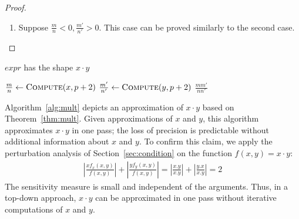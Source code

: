 \documentclass{article}
\newcommand{\expr}{\textit{expr}}
\numberwithin{mytheorem}{section}
\begin{document}
\begin{proof}
\begin{enumerate}
\begin{align*}
\end{align*}
To show that this is valid, it suffices to prove that:
\begin{align*}
\frac{mm'}{nn'}(1-\frac{1}{2^{p}})^2 \leq \frac{mm'}{nn'}(1-\frac{1}{2^{p-2}}) \\
\frac{mm'}{nn'}(1+\frac{1}{2^{p-2}})\leq \frac{mm'}{nn'}(1+\frac{1}{2^{p}})^2
\end{align*}
But $\frac{mm'}{nn'}<0$ and from Proposition~\ref{prop:prec2} (see \ref{app:prop_lem}) we know that both inequalities hold. 
\item
Suppose $\frac{m}{n}<0, \frac{m'}{n'}>0$. This case can be proved similarly to the second case.
\end{enumerate}
\end{proof}

\begin{algorithm}
\caption{Multiplication}\label{alg:mult}
\begin{algorithmic}[1]
\Require $\expr$ has the shape $x\cdot y$
\Procedure{Compute}{$\expr,p$}

\State $\frac{m}{n} \gets \Call{Compute}{x,p+2}$
\State $\frac{m'}{n'} \gets \Call{Compute}{y,p+2}$
\State \Return $\frac{mm'}{nn'}$
\EndProcedure
\end{algorithmic}
\end{algorithm} 


Algorithm~\ref{alg:mult} depicts an approximation of $x\cdot y$ based on Theorem~\ref{thm:mult}. Given approximations of $x$ and $y$, this algorithm approximates $x\cdot y$ in one pass; the loss of precision is predictable without additional information about $x$ and $y$. To confirm this claim, we apply the perturbation analysis of Section~\ref{sec:condition} on the function $f(x,y)=x\cdot y$:
\begin{align*}
|\frac{xf_x(x,y)}{f(x,y)}|+|\frac{yf_y(x,y)}{f(x,y)}|=|\frac{x.y}{x.y}|+|\frac{y.x}{x.y}|=2
\end{align*}
The sensitivity measure is small and independent of the arguments. Thus, in a top-down approach, $x\cdot y$ can be approximated in one pass without iterative computations of $x$ and $y$. 
\end{document}
